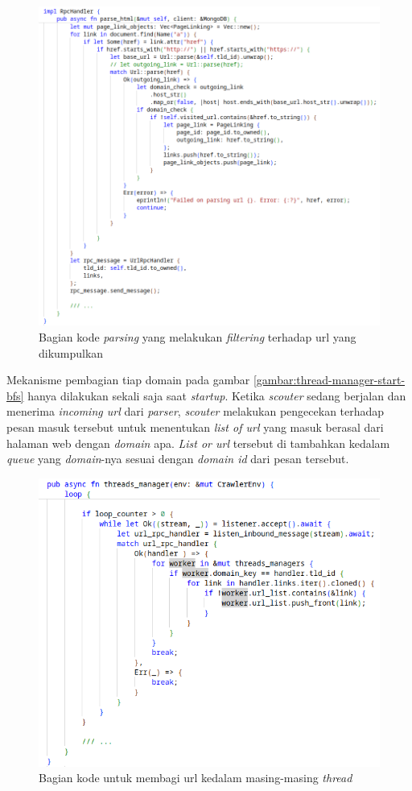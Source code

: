 \begin{figure}[H]
  \centering
  \includegraphics[keepaspectratio, width=12cm]{gambar/parse-link-gathering.png}
  \caption{Bagian kode \emph{parsing} yang melakukan \emph{filtering} terhadap url yang dikumpulkan}
  \label{gambar:parse-link-filtering}
\end{figure}

Mekanisme pembagian tiap domain pada gambar \ref{gambar:thread-manager-start-bfs} hanya dilakukan sekali saja saat \emph{startup}. Ketika \emph{scouter} sedang berjalan dan menerima \emph{incoming url} dari \emph{parser}, \emph{scouter} melakukan pengecekan terhadap pesan masuk tersebut untuk menentukan \emph{list of url} yang masuk berasal dari halaman web dengan \emph{domain} apa. \emph{List or url} tersebut di tambahkan kedalam \emph{queue} yang \emph{domain}-nya sesuai dengan \emph{domain id} dari pesan tersebut.

\begin{figure}[H]
  \centering
  \includegraphics[keepaspectratio, width=12cm]{gambar/scouter-listen-links.png}
  \caption{Bagian kode untuk membagi url kedalam masing-masing \emph{thread}}
  \label{gambar:scouter-listen-bfs}
\end{figure}


